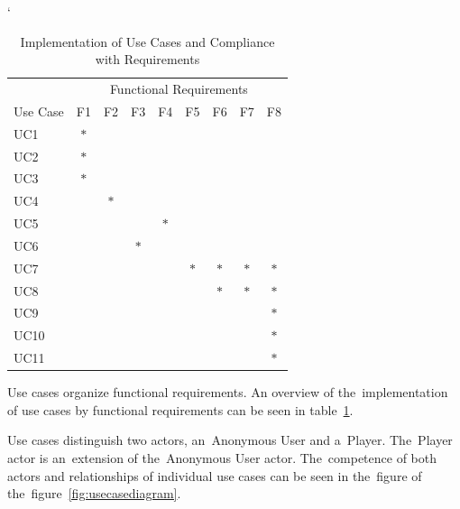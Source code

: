 \begin{table}[b]
    \catcode`
    \centering
    \begin{tabular}{lcccccccc}
    \toprule
    & \multicolumn{8}{c}{Functional Requirements} \\
    \cmidrule(l){2-9}
    Use Case & F1 & F2 & F3 & F4 & F5 & F6 & F7 & F8  \\
    \midrule
                         UC1  & $\ast$ &        &        &        &        &        &        &         \\
    \rowcolor[gray]{.95} UC2  & $\ast$ &        &        &        &        &        &        &         \\
                         UC3  & $\ast$ &        &        &        &        &        &        &         \\
    \rowcolor[gray]{.95} UC4  &        & $\ast$ &        &        &        &        &        &         \\
                         UC5  &        &        &        & $\ast$ &        &        &        &         \\
    \rowcolor[gray]{.95} UC6  &        &        & $\ast$ &        &        &        &        &         \\
                         UC7  &        &        &        &        & $\ast$ & $\ast$ & $\ast$ & $\ast$  \\
    \rowcolor[gray]{.95} UC8  &        &        &        &        &        & $\ast$ & $\ast$ & $\ast$  \\
                         UC9  &        &        &        &        &        &        &        & $\ast$  \\
    \rowcolor[gray]{.95} UC10 &        &        &        &        &        &        &        & $\ast$  \\
                         UC11 &        &        &        &        &        &        &        & $\ast$  \\
    \bottomrule
    \end{tabular}
    \caption{Implementation of Use Cases and Compliance with Requirements}
    \label{table:usecases-requirements}
\end{table}

Use cases organize functional requirements. 
An overview of the~implementation of use cases by functional requirements can be seen in table~\ref{table:usecases-requirements}.

Use cases distinguish two actors, an~Anonymous User and a~Player.
The~Player actor is an~extension of the~Anonymous User actor.
The~competence of both actors and relationships of individual use cases can be seen in the~figure of the~figure~\ref{fig:usecasediagram}.

